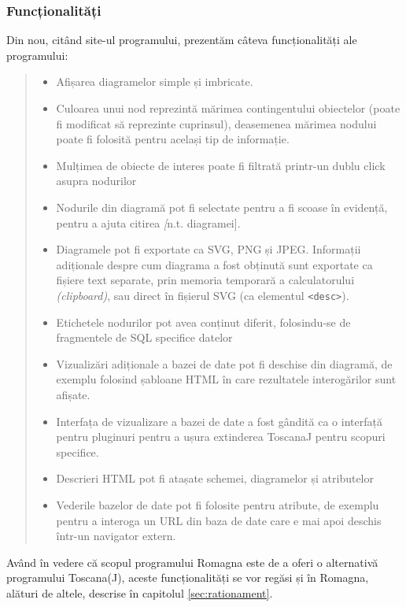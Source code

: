 \documentclass[12pt, a4paper, twoside, romanian]{teza-upb}
\begin{document}
      \subsubsection{Funcționalități}
        Din nou, citând site-ul programului\cite{Toscanaj:toscanaj}, prezentăm câteva funcționalități ale programului:

        \begin{quote}
          \begin{itemize}
            \item Afișarea diagramelor simple și imbricate.
            \item Culoarea unui nod reprezintă mărimea contingentului obiectelor (poate fi modificat să reprezinte cuprinsul), deasemenea mărimea nodului poate fi folosită pentru același tip de informație.
            \item Mulțimea de obiecte de interes poate fi filtrată printr-un dublu click asupra nodurilor
            \item Nodurile din diagramă pot fi selectate pentru a fi scoase în evidență, pentru a ajuta citirea \textit[n.t. diagramei].
            \item Diagramele pot fi exportate ca SVG, PNG și JPEG. Informații adiționale despre cum diagrama a fost obținută sunt exportate ca fișiere text separate, prin memoria temporară a calculatorului \textit{(clipboard)}, sau direct în fișierul SVG (ca elementul \verb=<desc>=).
            \item Etichetele nodurilor pot avea conținut diferit, folosindu-se de fragmentele de SQL specifice datelor
            \item Vizualizări adiționale a bazei de date pot fi deschise din diagramă, de exemplu folosind șabloane HTML în care rezultatele interogărilor sunt afișate.
            \item Interfața de vizualizare a bazei de date a fost gândită ca o interfață pentru pluginuri pentru a ușura extinderea ToscanaJ pentru scopuri specifice.
            \item Descrieri HTML pot fi atașate schemei, diagramelor și atributelor
            \item Vederile bazelor de date pot fi folosite pentru atribute, de exemplu pentru a interoga un URL din baza de date care e mai apoi deschis într-un navigator extern.
          \end{itemize}
        \end{quote}

        Având în vedere că scopul programului Romagna este de a oferi o alternativă programului Toscana(J), aceste funcționalități se vor regăsi și în Romagna, alături de altele, descrise în capitolul \ref{sec:rationament}.
\end{document}
